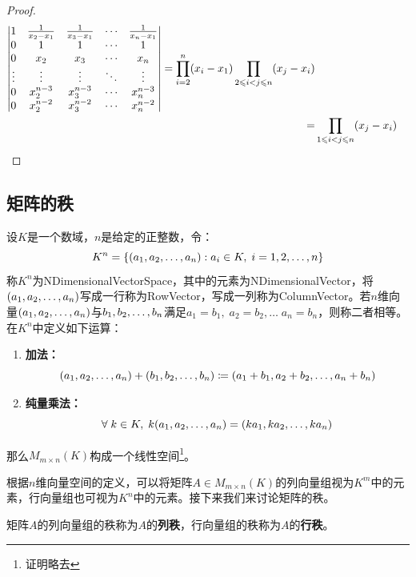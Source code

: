 \begin{proof}
\begin{align*}
\begin{vmatrix}
			1 & \frac{1}{x_2-x_1} & \frac{1}{x_3-x_1} & \cdots & \frac{1}{x_n-x_1} \\
			0 & 1 & 1 & \cdots & 1 \\
			0 & x_2& x_3 & \cdots & x_n \\
			\vdots & \vdots & \vdots & \ddots & \vdots \\
			0 & x_2^{n-3} & x_3^{n-3}& \cdots & x_n^{n-3}\\
			0 & x_2^{n-2} & x_3^{n-2} & \cdots & x_n^{n-2}
		\end{vmatrix} 
		=\prod_{i=2}^{n}(x_i-x_1)\prod_{2\leqslant i<j\leqslant n}(x_j-x_i) \\
		=&\prod_{1\leqslant i<j\leqslant n}(x_j-x_i)\qedhere
	\end{align*}
\end{proof}


\subsection{矩阵的秩}
\begin{definition}
	设$K$是一个数域，$n$是给定的正整数，令：
	\begin{equation*}
		K^n=\{(a_1, a_2, \dots, a_{n}):a_i\in K,\;i=1,2,\dots,n\}
	\end{equation*}
	称$K^n$为\gls{NDimensionalVectorSpace}，其中的元素为\gls{NDimensionalVector}，将$(a_1, a_2, \dots, a_{n})$写成一行称为\gls{RowVector}，写成一列称为\gls{ColumnVector}。若$n$维向量$(a_1, a_2, \dots, a_{n})$与$b_1, b_2, \dots, b_{n}$满足$a_1=b_1,\;a_2=b_2,\dots\;a_n=b_n$，则称二者相等。在$K^n$中定义如下运算：
	\begin{enumerate}
		\item \textbf{加法：} 
		\begin{equation*}
			(a_1, a_2, \dots, a_{n})+(b_1, b_2, \dots, b_{n})\coloneq(a_1+b_1,a_2+b_2,\dots,a_n+b_n)
		\end{equation*}
		\item \textbf{纯量乘法：}
		\begin{equation*}
			\forall\;k\in K,\; k(a_1, a_2, \dots, a_{n})=(ka_1, ka_2, \dots, ka_{n})
		\end{equation*}
	\end{enumerate}
	那么$M_{m\times n}(K)$构成一个线性空间\footnote{证明略去}。
\end{definition}
根据$n$维向量空间的定义，可以将矩阵$A\in M_{m\times n}(K)$的列向量组视为$K^m$中的元素，行向量组也可视为$K^n$中的元素。接下来我们来讨论矩阵的秩。
\begin{definition}
	矩阵$A$的列向量组的秩称为$A$的\textbf{列秩}，行向量组的秩称为$A$的\textbf{行秩}。
\end{definition}
